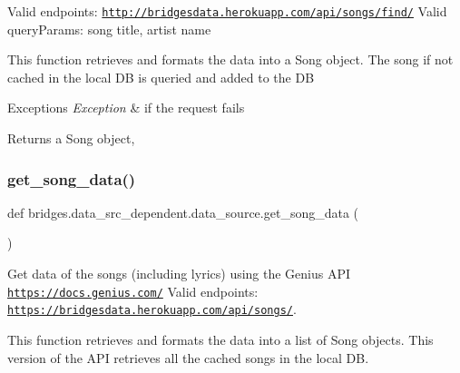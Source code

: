 Valid endpoints\+: \href{http://bridgesdata.herokuapp.com/api/songs/find/}{\tt http\+://bridgesdata.\+herokuapp.\+com/api/songs/find/} Valid query\+Params\+: song title, artist name

This function retrieves and formats the data into a Song object. The song if not cached in the local DB is queried and added to the DB


\begin{DoxyExceptions}{Exceptions}
{\em Exception} & if the request fails\\
\hline
\end{DoxyExceptions}
\begin{DoxyReturn}{Returns}
a Song object, 
\end{DoxyReturn}
\mbox{\label{namespacebridges_1_1data__src__dependent_1_1data__source_abf7f1f53dc13383fa296cb597e4a7ee0}} 
\subsubsection{\texorpdfstring{get\+\_\+song\+\_\+data()}{get\_song\_data()}}
{\footnotesize\ttfamily def bridges.\+data\+\_\+src\+\_\+dependent.\+data\+\_\+source.\+get\+\_\+song\+\_\+data (\begin{DoxyParamCaption}{ }\end{DoxyParamCaption})}



Get data of the songs (including lyrics) using the Genius A\+PI \href{https://docs.genius.com/}{\tt https\+://docs.\+genius.\+com/} Valid endpoints\+: \href{https://bridgesdata.herokuapp.com/api/songs/}{\tt https\+://bridgesdata.\+herokuapp.\+com/api/songs/}. 

This function retrieves and formats the data into a list of Song objects. This version of the A\+PI retrieves all the cached songs in the local DB.


